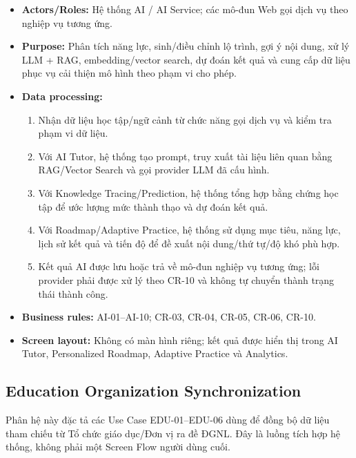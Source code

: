 \documentclass[12pt,a4paper,oneside]{report}
\begin{document}
\begin{itemize}
    \item \textbf{Actors/Roles:} Hệ thống AI / AI Service; các mô-đun Web gọi dịch vụ theo nghiệp vụ tương ứng.
    \item \textbf{Purpose:} Phân tích năng lực, sinh/điều chỉnh lộ trình, gợi ý nội dung, xử lý LLM + RAG, embedding/vector search, dự đoán kết quả và cung cấp dữ liệu phục vụ cải thiện mô hình theo phạm vi cho phép.
    \item \textbf{Data processing:}
    \begin{enumerate}
        \item Nhận dữ liệu học tập/ngữ cảnh từ chức năng gọi dịch vụ và kiểm tra phạm vi dữ liệu.
        \item Với AI Tutor, hệ thống tạo prompt, truy xuất tài liệu liên quan bằng RAG/Vector Search và gọi provider LLM đã cấu hình.
        \item Với Knowledge Tracing/Prediction, hệ thống tổng hợp bằng chứng học tập để ước lượng mức thành thạo và dự đoán kết quả.
        \item Với Roadmap/Adaptive Practice, hệ thống sử dụng mục tiêu, năng lực, lịch sử kết quả và tiến độ để đề xuất nội dung/thứ tự/độ khó phù hợp.
        \item Kết quả AI được lưu hoặc trả về mô-đun nghiệp vụ tương ứng; lỗi provider phải được xử lý theo CR-10 và không tự chuyển thành trạng thái thành công.
    \end{enumerate}
    \item \textbf{Business rules:} AI-01--AI-10; CR-03, CR-04, CR-05, CR-06, CR-10.
    \item \textbf{Screen layout:} Không có màn hình riêng; kết quả được hiển thị trong AI Tutor, Personalized Roadmap, Adaptive Practice và Analytics.
\end{itemize}

\subsection{Education Organization Synchronization}
\label{subsec:education-organization-sync}

Phân hệ này đặc tả các Use Case EDU-01--EDU-06 dùng để đồng bộ dữ liệu tham chiếu từ Tổ chức giáo dục/Đơn vị ra đề ĐGNL. Đây là luồng tích hợp hệ thống, không phải một Screen Flow người dùng cuối.
\end{document}
